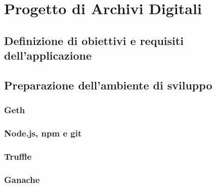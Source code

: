 \chapter{Progetto di Archivi Digitali}
\label{ch:archivi}

\section{Definizione di obiettivi e requisiti dell’applicazione}

\blindtext

\section{Preparazione dell'ambiente di sviluppo}

\blindtext

\subsection{Geth}

\blindtext

\subsection{Node.js, npm e git}

\blindtext

\subsection{Truffle}

\blindtext

\subsection{Ganache}

\blindtext